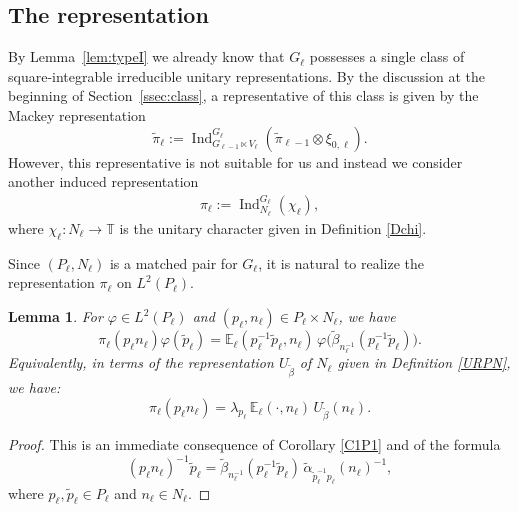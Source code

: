 \documentclass[a4paper,11pt,reqno]{amsart}
\numberwithin{equation}{section}
\newtheorem{lemma}[theorem]{Lemma}
\theoremstyle{remark}
\theoremstyle{definition}
\newcommand\T{{\mathbb T}}
\newcommand{\E}{\mathbb E}
\newcommand{\Ind}{\operatorname{Ind}}
\newcommand{\vf}{\varphi}
\begin{document}
\subsection{The representation}

By Lemma~\ref{lem:typeI} we already   know that $G_\ell$ possesses a single  class of square-integrable
irreducible unitary representations. By the discussion at the beginning of Section~\ref{ssec:class}, a representative of this class is given by the Mackey representation
$$
\tilde\pi_\ell:={\Ind}_{G_{\ell-1}\ltimes V_\ell}^{G_\ell}(\tilde\pi_{\ell-1}\otimes \xi_{0,\ell}).
$$
However, this representative is not suitable for us and instead we consider another induced representation
\begin{align}
\label{TheRep}
\pi_\ell:={\Ind}_{N_{\ell}}^{G_\ell}(\chi_\ell),
\end{align}
where $\chi_\ell:N_\ell\to\T$ is the unitary character given in Definition \ref{Dchi}.


Since $(P_\ell,N_\ell)$ is a matched pair for $G_\ell$, it is natural to realize the representation $\pi_\ell$ on $L^2(P_\ell)$.
\begin{lemma}
For $\vf\in L^2(P_\ell)$ and $(p_\ell,n_\ell)\in P_\ell\times N_\ell$, we have
$$
\pi_\ell(p_\ell n_\ell)\vf(\tilde p_\ell)=
\E_\ell(p_\ell^{-1}\tilde p_\ell ,n_\ell)\,
\vf\big( \tilde\beta_{n_{\ell}^{-1}}(p_\ell^{-1}\tilde p_\ell)\big).
$$
Equivalently, in terms of the representation $U_{\tilde\beta}$ of $N_\ell$ given  in Definition \ref{URPN},  we have:
\begin{equation}
\label{GPI}
\pi_\ell(p_\ell n_\ell)=\lambda_{p_\ell}\,\E_\ell(\cdot ,n_\ell)\,U_{\tilde\beta}(n_\ell).
\end{equation}
\end{lemma}
\begin{proof}
This is an immediate consequence of Corollary \ref{C1P1} and of the formula
$$
(p_\ell n_\ell)^{-1}\tilde p_\ell=\tilde\beta_{n_{\ell}^{-1}}(p_\ell^{-1}\tilde p_\ell)\,\tilde \alpha_{\tilde p_\ell^{-1}p_\ell}(n_\ell)^{-1},
$$
where $p_\ell,\tilde p_\ell\in P_\ell$ and $n_\ell\in N_\ell$.
\end{proof}
\end{document}
